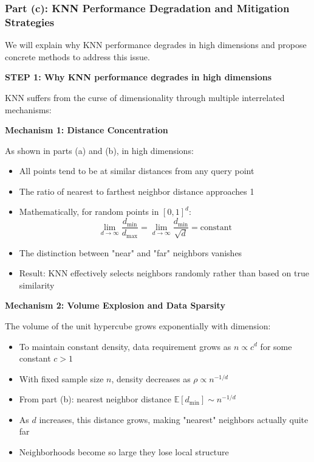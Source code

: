 \documentclass[12pt]{article}
\begin{document}
\subsubsection{Part (c): KNN Performance Degradation and Mitigation Strategies}

\begin{solution}
We will explain why KNN performance degrades in high dimensions and propose concrete methods to address this issue.

\textbf{STEP 1: Why KNN performance degrades in high dimensions}

KNN suffers from the curse of dimensionality through multiple interrelated mechanisms:

\textbf{Mechanism 1: Distance Concentration}

As shown in parts (a) and (b), in high dimensions:
\begin{itemize}
    \item All points tend to be at similar distances from any query point
    \item The ratio of nearest to farthest neighbor distance approaches 1
    \item Mathematically, for random points in \([0,1]^d\):
    \[
    \lim_{d \to \infty} \frac{d_{\min}}{d_{\max}} = \lim_{d \to \infty} \frac{d_{\min}}{\sqrt{d}} = \text{constant}
    \]
    \item The distinction between "near" and "far" neighbors vanishes
    \item Result: KNN effectively selects neighbors randomly rather than based on true similarity
\end{itemize}

\textbf{Mechanism 2: Volume Explosion and Data Sparsity}

The volume of the unit hypercube grows exponentially with dimension:
\begin{itemize}
    \item To maintain constant density, data requirement grows as \(n \propto c^d\) for some constant \(c > 1\)
    \item With fixed sample size \(n\), density decreases as \(\rho \propto n^{-1/d}\)
    \item From part (b): nearest neighbor distance \(\mathbb{E}[d_{\min}] \sim n^{-1/d}\)
    \item As \(d\) increases, this distance grows, making "nearest" neighbors actually quite far
    \item Neighborhoods become so large they lose local structure
\end{itemize}


\end{solution}
\end{document}
